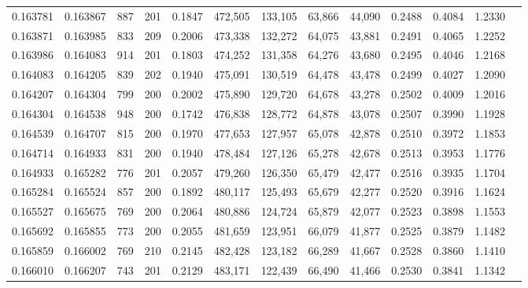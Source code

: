 \begin{tabular}{rrrrrrrrrrrrr}
0.163781 & 0.163867 &   887 & 201 &                                     0.1847 & 472,505 & 133,105 &  63,866 &  44,090 & 0.2488 & 0.4084 & 1.2330 \\
0.163871 & 0.163985 &   833 & 209 &                                     0.2006 & 473,338 & 132,272 &  64,075 &  43,881 & 0.2491 & 0.4065 & 1.2252 \\
0.163986 & 0.164083 &   914 & 201 &                                     0.1803 & 474,252 & 131,358 &  64,276 &  43,680 & 0.2495 & 0.4046 & 1.2168 \\
0.164083 & 0.164205 &   839 & 202 &                                     0.1940 & 475,091 & 130,519 &  64,478 &  43,478 & 0.2499 & 0.4027 & 1.2090 \\
0.164207 & 0.164304 &   799 & 200 &                                     0.2002 & 475,890 & 129,720 &  64,678 &  43,278 & 0.2502 & 0.4009 & 1.2016 \\
0.164304 & 0.164538 &   948 & 200 &                                     0.1742 & 476,838 & 128,772 &  64,878 &  43,078 & 0.2507 & 0.3990 & 1.1928 \\
0.164539 & 0.164707 &   815 & 200 &                                     0.1970 & 477,653 & 127,957 &  65,078 &  42,878 & 0.2510 & 0.3972 & 1.1853 \\
0.164714 & 0.164933 &   831 & 200 &                                     0.1940 & 478,484 & 127,126 &  65,278 &  42,678 & 0.2513 & 0.3953 & 1.1776 \\
0.164933 & 0.165282 &   776 & 201 &                                     0.2057 & 479,260 & 126,350 &  65,479 &  42,477 & 0.2516 & 0.3935 & 1.1704 \\
0.165284 & 0.165524 &   857 & 200 &                                     0.1892 & 480,117 & 125,493 &  65,679 &  42,277 & 0.2520 & 0.3916 & 1.1624 \\
0.165527 & 0.165675 &   769 & 200 &                                     0.2064 & 480,886 & 124,724 &  65,879 &  42,077 & 0.2523 & 0.3898 & 1.1553 \\
0.165692 & 0.165855 &   773 & 200 &                                     0.2055 & 481,659 & 123,951 &  66,079 &  41,877 & 0.2525 & 0.3879 & 1.1482 \\
0.165859 & 0.166002 &   769 & 210 &                                     0.2145 & 482,428 & 123,182 &  66,289 &  41,667 & 0.2528 & 0.3860 & 1.1410 \\
0.166010 & 0.166207 &   743 & 201 &                                     0.2129 & 483,171 & 122,439 &  66,490 &  41,466 & 0.2530 & 0.3841 & 1.1342 \\

\end{tabular}
